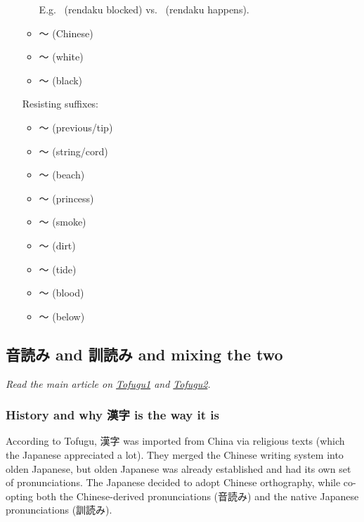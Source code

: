 \documentclass[../nihongo-gakushuu-kyouzai.tex]{subfiles}
\begin{document}
\begin{itemize}
\begin{itemize}
        E.g.\  (rendaku blocked) vs.\  (rendaku happens).
        \item {}〜 (Chinese)
        \item {}〜 (white)
        \item {}〜 (black)
    \end{itemize}

    Resisting suffixes:
    \begin{itemize}
        \item 〜 (previous/tip)
        \item 〜 (string/cord)
        \item 〜 (beach)
        \item 〜 (princess)
        \item 〜 (smoke)
        \item 〜 (dirt)
        \item 〜 (tide)
        \item 〜 (blood)
        \item 〜 (below)
    \end{itemize}
\end{itemize}


\subsection{音読み and 訓読み and mixing the two} \label{sec:on-yomi-and-kun-yomi}
\emph{Read the main article on \href{https://www.tofugu.com/japanese/onyomi-kunyomi/}{Tofugu1} and \href{https://www.tofugu.com/japanese/weird-kanji-readings/}{Tofugu2}.}

\subsubsection{History and why 漢字 is the way it is}
According to Tofugu, 漢字 was imported from China via religious texts (which the Japanese appreciated a lot). They merged the Chinese writing system into olden Japanese, but olden Japanese was already established and had its own set of pronunciations. The Japanese decided to adopt Chinese orthography, while co-opting both the Chinese-derived pronunciations (音読み) and the native Japanese pronunciations (訓読み).
\end{document}
